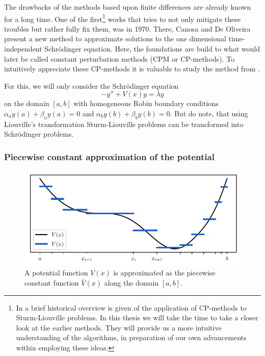 The drawbacks of the methods based upon finite differences are already known for a long time. One of the first\footnote{In \cite{ledoux_solving_2010} a brief historical overview is given of the application of CP-methods to Sturm-Liouville problems. In this thesis we will take the time to take a closer look at the earlier methods. They will provide us a more intuitive understanding of the algorithms, in preparation of our own advancements within employing these ideas.} works that tries to not only mitigate these troubles but rather fully fix them, was \cite{canosa_new_1970} in 1970. There, Canosa and De Oliveira present a new method to approximate solutions to the one dimensional time-independent Schrödinger equation. Here, the foundations are build to what would later be called constant perturbation methods (CPM or CP-methods). To intuitively appreciate these CP-methods it is valuable to study the method from \cite{canosa_new_1970}.

For this, we will only consider the Schrödinger equation
\begin{equation}\label{equ:c2_cpm_schrodinger}
    - y'' + V(x) y = \lambda y
\end{equation}
on the domain $[a, b]$ with homogeneous Robin boundary conditions $\alpha_a y(a) + \beta_a y(a) = 0$ and $\alpha_b y(b) + \beta_b y(b) = 0$. But do note, that using Liouville's transformation Sturm-Liouville problems can be transformed into Schrödinger problems.

\subsubsection{Piecewise constant approximation of the potential}

\begin{figure}
    \begin{center}
        \includegraphics[width=\textwidth]{img/chapter2/cpm_constant_approx.pdf}
        \caption{A potential function $V(x)$ is approximated as the piecewise constant function $\bar{V}(x)$ along the domain $[a, b]$.}
        \label{fig:c2_cpm_constant_approx}
    \end{center}
\end{figure}

